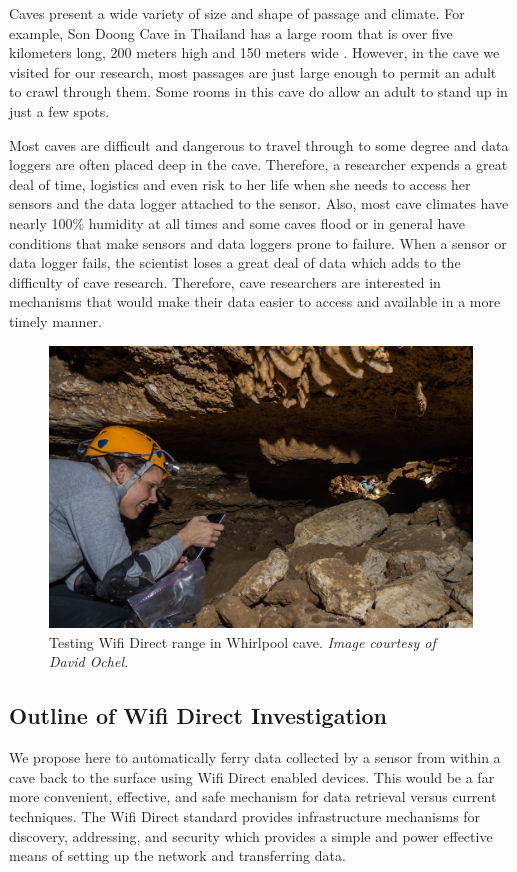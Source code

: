 \documentclass[10pt,twocolumn]{article}
\begin{document}
Caves present a wide variety of size and shape of passage and climate. 
For example, Son Doong Cave in Thailand has a large room that is over five kilometers long, 200 meters high and 150 meters wide \cite{sondoong}.
However, in the cave we visited for our research, most passages are just large enough to permit an adult to crawl through them.
Some rooms in this cave do allow an adult to stand up in just a few spots.

Most caves are difficult and dangerous to travel through to some degree and data loggers are often placed deep in the cave.
Therefore, a researcher expends a great deal of time, logistics and even risk to her life when she needs to access her sensors and the data logger attached to the sensor.
Also, most cave climates have nearly 100\% humidity at all times and some caves flood or in general have conditions that make sensors and data loggers prone to failure.
When a sensor or data logger fails, the scientist loses a great deal of data which adds to the difficulty of cave research.
Therefore, cave researchers are interested in mechanisms that would make their data easier to access and available in a more timely manner.

\begin{figure}[t]
\includegraphics[width=\textwidth]{cavewifi2}
\caption{Testing Wifi Direct range in Whirlpool cave. \textit{Image courtesy of David Ochel.}}
\end{figure}

\subsection{Outline of Wifi Direct Investigation}
We propose here to automatically ferry data collected by a sensor from within a cave back to the surface using Wifi Direct enabled devices. 
This would be a far more convenient, effective, and safe mechanism for data retrieval versus current techniques.  
The Wifi Direct standard provides infrastructure mechanisms for discovery, addressing, and security which 
provides a simple and power effective means of setting up the network and transferring data. 
\end{document}
